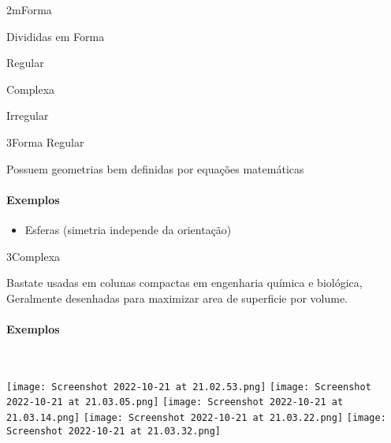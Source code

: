 \documentclass[\mainfilename]{subfiles}
\begin{document}
\begin{sectionBox}2m{Forma} %
    
    Divididas em Forma
    \begin{itemize}
        \begin{multicols}{3}
            \item Regular
            \item Complexa
            \item Irregular
        \end{multicols}
    \end{itemize}

    \begin{sectionBox}3{Forma Regular} %
        
        Possuem geometrias bem definidas por equações matemáticas

        \paragraph*{Exemplos}
        \begin{itemize}
            \item Esferas (simetria independe da orientação)
        \end{itemize}
        
    \end{sectionBox}

    \begin{sectionBox}3{Complexa} %
        
        Bastate usadas em colunas compactas em engenharia química e biológica,
        Geralmente desenhadas para maximizar area de superficie por volume.

        \paragraph*{Exemplos}\ 
        \begin{multicols}{4}\centering
                \texttt{[image: Screenshot 2022-10-21 at 21.02.53.png]}
                \texttt{[image: Screenshot 2022-10-21 at 21.03.05.png]}
                \texttt{[image: Screenshot 2022-10-21 at 21.03.14.png]}
                \texttt{[image: Screenshot 2022-10-21 at 21.03.22.png]}
                \texttt{[image: Screenshot 2022-10-21 at 21.03.32.png]}
        \end{multicols}
        

\end{sectionBox}
\end{sectionBox}
\end{document}
